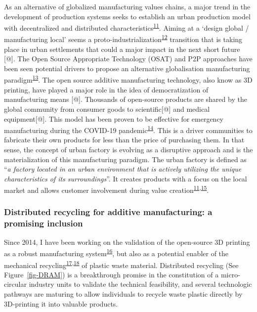\documentclass[
  11pt,
  a4paperpaper,
  onecolumn]{article}
\begin{document}
As an alternative of globalized manufacturing values chains, a major
trend in the development of production systems seeks to establish an
urban production model with decentralized and distributed
characteristics\textsuperscript{\protect\hyperlink{ref-Herrmann2020}{11}}.
Aiming at a `design global / manufacturing local' seems a
proto-industrialization\textsuperscript{\protect\hyperlink{ref-sabel1985}{12}}
transition that is taking place in urban settlements that could a major
impact in the next short future {[}@{]}. The Open Source Appropriate
Technology (OSAT) and P2P approaches have been seen potential drivers to
propose an alternative globalisation manufacturing
paradigm\textsuperscript{\protect\hyperlink{ref-Heikkinen2020a}{13}}.
The open source additive manufacturing technology, also know as 3D
printing, have played a major role in the idea of democratization of
manufacturing means {[}@{]}. Thousands of open-source products are
shared by the global community from consumer goods to scientific{[}@{]}
and medical equipment{[}@{]}. This model has been proven to be effective
for emergency manufacturing during the COVID-19
pandemic\textsuperscript{\protect\hyperlink{ref-Pearce2020a}{14}}. This
is a driver communities to fabricate their own products for less than
the price of purchasing them. In that sense, the concept of urban
factory is evolving as a disruptive approach and is the materialization
of this manufacturing paradigm. The urban factory is defined as
``\emph{a factory located in an urban environment that is actively
utilizing the unique characteristics of its surroundings}''. It creates
products with a focus on the local market and allows customer
involvement during value
creation\textsuperscript{\protect\hyperlink{ref-Herrmann2020}{11},\protect\hyperlink{ref-Ijassi2022}{15}}.

\hypertarget{distributed-recycling-for-additive-manufacturing-a-promising-inclusion}{%
\subsubsection{Distributed recycling for additive manufacturing: a
promising
inclusion}\label{distributed-recycling-for-additive-manufacturing-a-promising-inclusion}}

Since 2014, I have been working on the validation of the open-source 3D
printing as a robust manufacturing
system\textsuperscript{\protect\hyperlink{ref-CruzSanchez2014}{16}}, but
also as a potential enabler of the mechanical
recycling\textsuperscript{\protect\hyperlink{ref-Cruz2015}{17},\protect\hyperlink{ref-CruzSanchez2017}{18}}
of plastic waste material. Distributed recycling (See
Figure~\ref{fig-DRAM}) is a breakthrough promise in the constitution of
a micro-circular industry units to validate the technical feasibility,
and several technologic pathways are maturing to allow individuals to
recycle waste plastic directly by 3D-printing it into valuable products.
\end{document}
